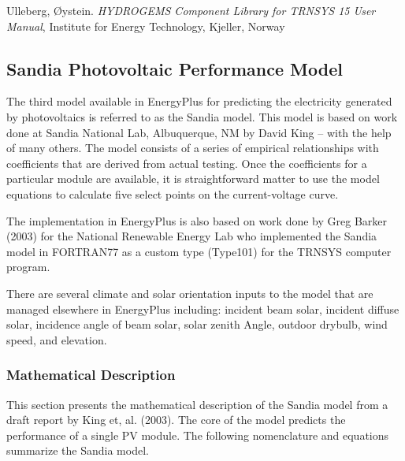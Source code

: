 Ulleberg, Øystein. \emph{HYDROGEMS Component Library for TRNSYS 15 User Manual}, Institute for Energy Technology, Kjeller, Norway \emph{~}

\subsection{Sandia Photovoltaic Performance Model}\label{sandia-photovoltaic-performance-model}

The third model available in EnergyPlus for predicting the electricity generated by photovoltaics is referred to as the Sandia model. This model is based on work done at Sandia National Lab, Albuquerque, NM by David King -- with the help of many others. The model consists of a series of empirical relationships with coefficients that are derived from actual testing. Once the coefficients for a particular module are available, it is straightforward matter to use the model equations to calculate five select points on the current-voltage curve.

The implementation in EnergyPlus is also based on work done by Greg Barker (2003) for the National Renewable Energy Lab who implemented the Sandia model in FORTRAN77 as a custom type (Type101) for the TRNSYS computer program.

There are several climate and solar orientation inputs to the model that are managed elsewhere in EnergyPlus including: incident beam solar, incident diffuse solar, incidence angle of beam solar, solar zenith Angle, outdoor drybulb, wind speed, and elevation.

\subsubsection{Mathematical Description}\label{mathematical-description-2}

This section presents the mathematical description of the Sandia model from a draft report by King et, al. (2003). The core of the model predicts the performance of a single PV module. The following nomenclature and equations summarize the Sandia model.

